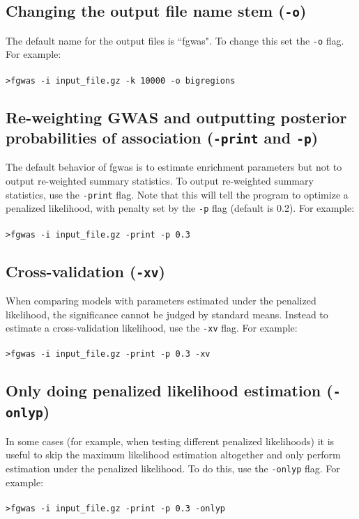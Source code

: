 \documentclass[11pt,titlepage]{article}
\begin{document}
\subsection{Changing the output file name stem (\texttt{-o})}
The default name for the output files is ``fgwas". To change this set the \texttt{-o} flag. For example:
\\
\\
\texttt{>fgwas -i input\_file.gz -k 10000 -o bigregions}


\subsection{Re-weighting GWAS and outputting posterior probabilities of association (\texttt{-print} and \texttt{-p})}
The default behavior of fgwas is to estimate enrichment parameters but not to output re-weighted summary statistics. To output re-weighted summary statistics, use the \texttt{-print} flag. Note that this will tell the program to optimize a penalized likelihood, with penalty set by the \texttt{-p} flag (default is 0.2). For example:
\\
\\
\texttt{>fgwas -i input\_file.gz -print -p 0.3}

\subsection{Cross-validation (\texttt{-xv})}
When comparing models with parameters estimated under the penalized likelihood, the significance cannot be judged by standard means. Instead to estimate a cross-validation likelihood, use the \texttt{-xv} flag. For example:
\\
\\
\texttt{>fgwas -i input\_file.gz -print -p 0.3 -xv}
\subsection{Only doing penalized likelihood estimation (\texttt{-onlyp})}
In some cases (for example, when testing different penalized likelihoods) it is useful to skip the maximum likelihood estimation altogether and only perform estimation under the penalized likelihood. To do this, use the \texttt{-onlyp} flag. For example:
\\
\\
\texttt{>fgwas -i input\_file.gz -print -p 0.3 -onlyp}
\end{document}
